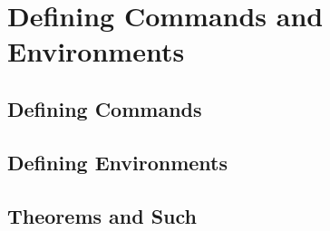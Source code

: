 \section{Defining Commands and Environments}
\subsection{Defining Commands}


\subsection{Defining Environments}


\subsection{Theorems and Such}